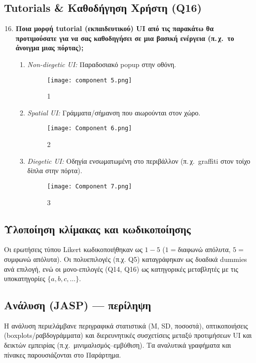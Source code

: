 \subsection*{Tutorials \& Καθοδήγηση Χρήστη (Q16)}
\begin{enumerate}\setcounter{enumi}{15}
  \item \textbf{Ποια μορφή tutorial (εκπαιδευτικού) UI από τις παρακάτω θα προτιμούσατε για να σας καθοδηγήσει σε μια βασική ενέργεια (π.\,χ.\ το άνοιγμα μιας πόρτας);}
  \begin{enumerate}
    \item \textit{Non-diegetic UI:} Παραδοσιακό popup στην οθόνη.
\begin{figure}[H]
    \centering
    \texttt{[image: component 5.png]}
    \caption{1}
    \label{fig:placeholder}
\end{figure}
    \item \textit{Spatial UI:} Γράμματα/σήμανση που αιωρούνται στον χώρο.
\begin{figure}[H]
    \centering
    \texttt{[image: Component 6.png]}
    \caption{2}
    \label{fig:placeholder}
\end{figure}
    \item \textit{Diegetic UI:} Οδηγία ενσωματωμένη στο περιβάλλον (π.\,χ.\ graffiti στον τοίχο δίπλα στην πόρτα).
\begin{figure}[H]
    \centering
    \texttt{[image: Component 7.png]}
    \caption{3}
    \label{fig:placeholder}
\end{figure}
  \end{enumerate}
\end{enumerate}


\subsection{Υλοποίηση κλίμακας και κωδικοποίησης}
Οι ερωτήσεις τύπου Likert κωδικοποιήθηκαν ως \(1\!-\!5\) (\(1=\)διαφωνώ απόλυτα, \(5=\)συμφωνώ απόλυτα). Οι πολυεπιλογές (π.χ. Q5) καταγράφηκαν ως δυαδικά dummies ανά επιλογή, ενώ οι μονο-επιλογές (Q14, Q16) ως κατηγορικές μεταβλητές με τις υποκατηγορίες \(\{a,b,c,\ldots\}\).

\subsection{Ανάλυση (JASP) — περίληψη}
Η ανάλυση περιελάμβανε περιγραφικά στατιστικά (Μ, SD, ποσοστά), οπτικοποιήσεις (boxplots/ραβδογράμματα) και διερευνητικές συσχετίσεις μεταξύ προτιμήσεων UI και δεικτών εμπειρίας (π.χ.\ μινιμαλισμός–εμβύθιση). Τα αναλυτικά γραφήματα και πίνακες παρουσιάζονται στο Παράρτημα.


